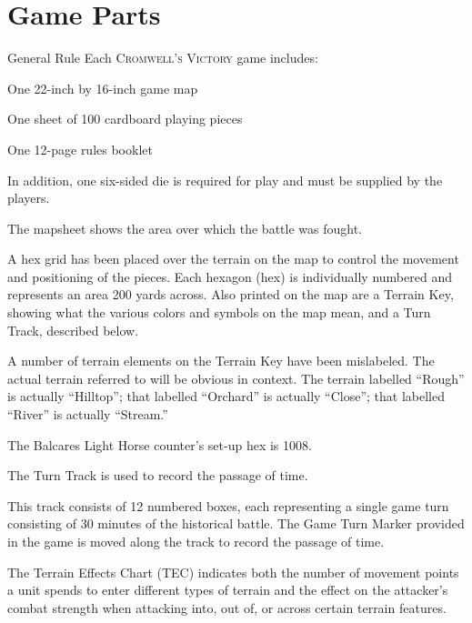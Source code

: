 \section{Game Parts}

\begin{rulebox}{General Rule}
Each \textsc{Cromwell's Victory} game includes:
\begin{tightitems}
  \item One 22-inch by 16-inch game map
  \item One sheet of 100 cardboard playing pieces
  \item One 12-page rules booklet
\end{tightitems}
In addition, one six-sided die is required for play and must be supplied by the players.
\end{rulebox}

 The mapsheet shows the area over which the battle was fought.

A hex grid has been placed over the terrain on the map to control the movement and positioning of the pieces. Each hexagon (hex) is individually numbered and represents an area 200 yards across. Also printed on the map are a Terrain Key, showing what the various colors and symbols on the map mean, and a Turn Track, described below.

\begin{tcolorbox}[
  colback=cvsand!45,
  colframe=cvred,
  boxrule=.5pt,
  arc=1pt,
  left=5pt,right=5pt,top=4pt,bottom=4pt,
  before skip=5pt,after skip=6pt,
  title={\sffamily\bfseries\small Errata},
  coltitle=white,
  colbacktitle=cvred
]
A number of terrain elements on the Terrain Key have been mislabeled. The actual terrain referred to will be obvious in context. The terrain labelled ``Rough'' is actually ``Hilltop''; that labelled ``Orchard'' is actually ``Close''; that labelled ``River'' is actually ``Stream.''

\smallskip
The Balcares Light Horse counter's set-up hex is 1008.
\end{tcolorbox}

 The Turn Track is used to record the passage of time.

This track consists of 12 numbered boxes, each representing a single game turn consisting of 30 minutes of the historical battle. The Game Turn Marker provided in the game is moved along the track to record the passage of time.

 The Terrain Effects Chart (TEC) indicates both the number of movement points a unit spends to enter different types of terrain and the effect on the attacker's combat strength when attacking into, out of, or across certain terrain features.

